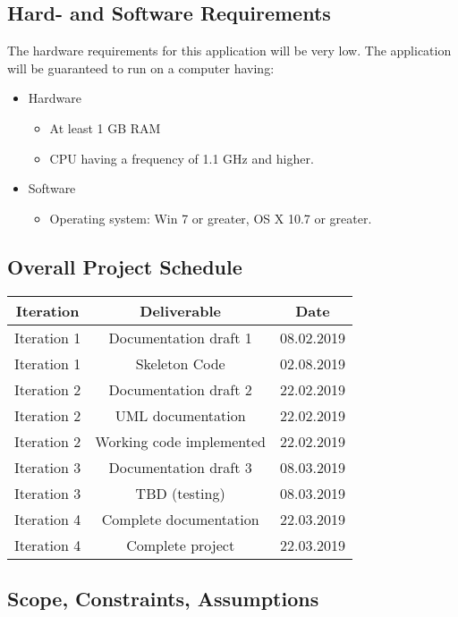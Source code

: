 \documentclass[12pt, letterpaper]{article}
\begin{document}
\subsection{Hard- and Software Requirements}
The hardware requirements for this application will be very low. The application will be guaranteed to run on a computer having:
\begin{itemize}
	\item Hardware
		\begin{itemize}
		\item At least 1 GB RAM
		\item CPU having a frequency of 1.1 GHz and higher.   
	\end{itemize}
	\item Software
	\begin{itemize}
		\item Operating system: Win 7 or greater, OS X 10.7 or greater.
	\end{itemize}
\end{itemize} 
\subsection{Overall Project Schedule}
\begin{center}
	\begin{tabular}{|c|c|c|} 
		\hline
		Iteration & Deliverable & Date \\ [0.5ex] 
		\hline\hline
		Iteration 1 & Documentation draft 1  & 08.02.2019 \\ 
		\hline
		Iteration 1 & Skeleton Code & 02.08.2019 \\
		\hline
		Iteration 2 & Documentation draft 2 & 22.02.2019  \\
		\hline
		Iteration 2 & UML documentation & 22.02.2019  \\
		\hline
		Iteration 2 & Working code implemented & 22.02.2019  \\
		\hline
		Iteration 3 & Documentation draft 3 & 08.03.2019  \\
		\hline
		Iteration 3 & TBD (testing) & 08.03.2019  \\
		\hline
		Iteration 4 & Complete documentation & 22.03.2019  \\
		\hline
		Iteration 4 & Complete project & 22.03.2019  \\ [1ex] 
		\hline
	\end{tabular}
\end{center}
\subsection{Scope, Constraints, Assumptions}
\end{document}
